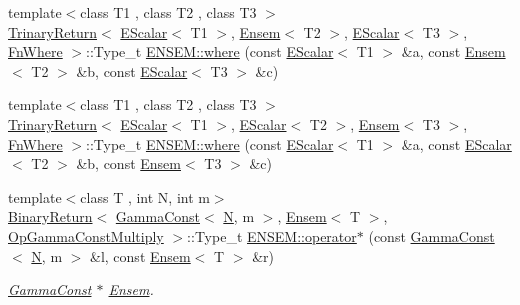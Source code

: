 \begin{DoxyCompactItemize}
\item 
{\footnotesize template$<$class T1 , class T2 , class T3 $>$ }\\\mbox{\hyperlink{structENSEM_1_1TrinaryReturn}{Trinary\+Return}}$<$ \mbox{\hyperlink{classENSEM_1_1EScalar}{E\+Scalar}}$<$ T1 $>$, \mbox{\hyperlink{classENSEM_1_1Ensem}{Ensem}}$<$ T2 $>$, \mbox{\hyperlink{classENSEM_1_1EScalar}{E\+Scalar}}$<$ T3 $>$, \mbox{\hyperlink{structENSEM_1_1FnWhere}{Fn\+Where}} $>$\+::Type\+\_\+t \mbox{\hyperlink{group__eensem_gaa4e0f13f6f2d07520289a95c6290a38b}{E\+N\+S\+E\+M\+::where}} (const \mbox{\hyperlink{classENSEM_1_1EScalar}{E\+Scalar}}$<$ T1 $>$ \&a, const \mbox{\hyperlink{classENSEM_1_1Ensem}{Ensem}}$<$ T2 $>$ \&b, const \mbox{\hyperlink{classENSEM_1_1EScalar}{E\+Scalar}}$<$ T3 $>$ \&c)
\item 
{\footnotesize template$<$class T1 , class T2 , class T3 $>$ }\\\mbox{\hyperlink{structENSEM_1_1TrinaryReturn}{Trinary\+Return}}$<$ \mbox{\hyperlink{classENSEM_1_1EScalar}{E\+Scalar}}$<$ T1 $>$, \mbox{\hyperlink{classENSEM_1_1EScalar}{E\+Scalar}}$<$ T2 $>$, \mbox{\hyperlink{classENSEM_1_1Ensem}{Ensem}}$<$ T3 $>$, \mbox{\hyperlink{structENSEM_1_1FnWhere}{Fn\+Where}} $>$\+::Type\+\_\+t \mbox{\hyperlink{group__eensem_gab6c29ad51b23e921cd47448cfa4eabaa}{E\+N\+S\+E\+M\+::where}} (const \mbox{\hyperlink{classENSEM_1_1EScalar}{E\+Scalar}}$<$ T1 $>$ \&a, const \mbox{\hyperlink{classENSEM_1_1EScalar}{E\+Scalar}}$<$ T2 $>$ \&b, const \mbox{\hyperlink{classENSEM_1_1Ensem}{Ensem}}$<$ T3 $>$ \&c)
\item 
{\footnotesize template$<$class T , int N, int m$>$ }\\\mbox{\hyperlink{structENSEM_1_1BinaryReturn}{Binary\+Return}}$<$ \mbox{\hyperlink{classENSEM_1_1GammaConst}{Gamma\+Const}}$<$ \mbox{\hyperlink{operator__name__util_8cc_a7722c8ecbb62d99aee7ce68b1752f337}{N}}, m $>$, \mbox{\hyperlink{classENSEM_1_1Ensem}{Ensem}}$<$ T $>$, \mbox{\hyperlink{structENSEM_1_1OpGammaConstMultiply}{Op\+Gamma\+Const\+Multiply}} $>$\+::Type\+\_\+t \mbox{\hyperlink{group__eensem_gab92286e5b611f00cb8f733f9d41d06a4}{E\+N\+S\+E\+M\+::operator$\ast$}} (const \mbox{\hyperlink{classENSEM_1_1GammaConst}{Gamma\+Const}}$<$ \mbox{\hyperlink{operator__name__util_8cc_a7722c8ecbb62d99aee7ce68b1752f337}{N}}, m $>$ \&l, const \mbox{\hyperlink{classENSEM_1_1Ensem}{Ensem}}$<$ T $>$ \&r)
\begin{DoxyCompactList}\small\item\em \mbox{\hyperlink{classENSEM_1_1GammaConst}{Gamma\+Const}} $\ast$ \mbox{\hyperlink{classENSEM_1_1Ensem}{Ensem}}. \end{DoxyCompactList}\item 

\end{DoxyCompactItemize}
